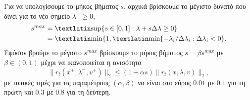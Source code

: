 Για να υπολογίσουμε το μήκος βήματος \( s \), αρχικά βρίσκουμε το μέγιστο δυνατό
που δίνει για το νέο σημείο \( \lambda^+ \geq 0 \),
\begin{align*}
    s^{max} &= \mathtxt{sup}\{s \in [0,1] : \lambda + s \Delta \lambda \geq 0 \}
    \\
    &= \mathtxt{min}\{1, \mathtxt{min}\{ -\lambda_i/\Delta \lambda_i: \Delta
        \lambda_i < 0 \}.
\end{align*}
Εφόσον βρούμε το μέγιστο \( s^{max} \) βρίσκουμε το μήκος βήματος \( s = \beta
s^{max} \) με \( \beta \in (0, 1) \) μέχρι να ικανοποιείται η ανισότητα
\begin{equation*}
    \| r_t(x^+, \lambda^+, v^+) \|_2 \leq (1 - \alpha s) \|r_t(x, \lambda, v) \|_2,
\end{equation*}
με τυπικές τιμές για τις παραμέτρους \( (\alpha, \beta) \) να είναι στο εύρος \(
0.01\) με \(0.1\) για τη πρώτη και \( 0.3\) με \(0.8\) για τη δεύτερη.
